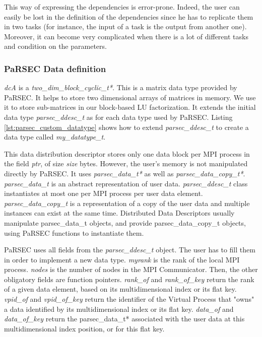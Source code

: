 

This way of expressing the dependencies is error-prone.
Indeed, the user can easily be lost in the definition of the dependencies since he has to replicate them in two tasks (for instance, the input of a task is the output from another one).
Moreover, it can become very complicated when there is a lot of different tasks and condition on the parameters.

\subsubsection{PaRSEC Data definition}
\textit{dcA} is a \textit{two\_dim\_block\_cyclic\_t*}.
This is a matrix data type provided by PaRSEC.
It helps to store two dimensional arrays of matrices in memory.
We use it to store sub-matrices in our block-based LU factorization.
It extends the initial data type \textit{parsec\_ddesc\_t} as for each data type used by PaRSEC.
Listing \ref{lst:parsec_custom_datatype} shows how to extend \textit{parsec\_ddesc\_t} to create a data type called \textit{my\_datatype\_t}.

This data distribution descriptor stores only one data block per MPI \cite{MPIForum} process in the field \textit{ptr}, of size \textit{size} bytes.
However, the user's memory is not manipulated directly by PaRSEC.
It uses \textit{parsec\_data\_t*} as well as \textit{parsec\_data\_copy\_t*}.
\textit{parsec\_data\_t} is an abstract representation of user data.
\textit{parsec\_ddesc\_t} class instantiates at most one per MPI process per user data element.
\textit{parsec\_data\_copy\_t} is a representation of a copy of the user data and multiple instances can exist at the same time.
Distributed Data Descriptors usually manipulate parsec\_data\_t objects, and provide parsec\_data\_copy\_t objects, using PaRSEC functions to instantiate them.




PaRSEC uses all fields from the \textit{parsec\_ddesc\_t} object.
The user has to fill them in order to implement a new data type.
\textit{myrank} is the rank of the local MPI process.
\textit{nodes} is the number of nodes in the MPI Communicator.
Then, the other obligatory fields are function pointers.
\textit{rank\_of} and \textit{rank\_of\_key} return the rank of a given data element, based on its multidimensional index or its flat key.
\textit{vpid\_of} and \textit{vpid\_of\_key} return the identifier of the Virtual Process that "owns" a data identified by its multidimensional index or its flat key.
\textit{data\_of} and \textit{data\_of\_key} return the parsec\_data\_t* associated with the user data at this multidimensional index position, or for this flat key.

